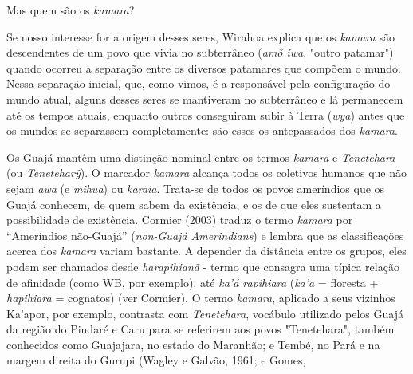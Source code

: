 Mas quem são os \emph{kamara}?

Se nosso interesse for a origem desses seres, Wirahoa explica que os
\emph{kamara} são descendentes de um povo que vivia no subterrâneo
(\emph{amõ iwa}, "outro patamar") quando ocorreu a separação entre os
diversos patamares que compõem o mundo. Nessa separação inicial, que,
como vimos, é a responsável pela configuração do mundo atual, alguns
desses seres se mantiveram no subterrâneo e lá permanecem até os tempos
atuais, enquanto outros conseguiram subir à Terra (\emph{wya}) antes que
os mundos se separassem completamente: são esses os antepassados dos
\emph{kamara}.

Os Guajá mantêm uma distinção nominal entre os termos \emph{kamara} e
\emph{Tenetehara} (ou \emph{Teneteharỹ}). O marcador \emph{kamara}
alcança todos os coletivos humanos que não sejam \emph{awa} (e
\emph{mihua}) ou \emph{karaia}. Trata-se de todos os povos ameríndios
que os Guajá conhecem, de quem sabem da existência, e os de que eles
sustentam a possibilidade de existência. Cormier (2003) traduz o termo
\emph{kamara} por ``Ameríndios não-Guajá'' (\emph{non-Guajá
Amerindians}) e lembra que as classificações acerca dos \emph{kamara}
variam bastante. A depender da distância entre os grupos, eles podem ser
chamados desde \emph{harapihianã} - termo que consagra uma típica
relação de afinidade (como WB, por exemplo), até \emph{ka'á rapihiara}
(\emph{ka'a} = floresta + \emph{hapihiara} = cognatos) (ver Cormier). O
termo \emph{kamara}, aplicado a seus vizinhos Ka'apor, por exemplo,
contrasta com \emph{Tenetehara}, vocábulo utilizado pelos Guajá da
região do Pindaré e Caru para se referirem aos povos "Tenetehara",
também conhecidos como Guajajara, no estado do Maranhão; e Tembé, no
Pará e na margem direita do Gurupi (Wagley e Galvão, 1961; e Gomes,
